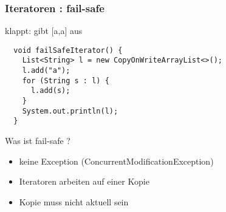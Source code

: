 \begin{frame}[fragile]
  \frametitle{Iteratoren : fail-safe}

klappt: gibt [a,a] aus
  \begin{lstlisting}
  void failSafeIterator() {
    List<String> l = new CopyOnWriteArrayList<>();
    l.add("a");
    for (String s : l) {
      l.add(s);
    }
    System.out.println(l);
  }
  \end{lstlisting}

  \begin{block}{Was ist fail-safe ?}
    \begin{itemize}
      \item keine Exception (ConcurrentModificationException)
      \item Iteratoren arbeiten auf einer Kopie
      \item Kopie muss nicht aktuell sein
    \end{itemize}
  \end{block}

\end{frame}

